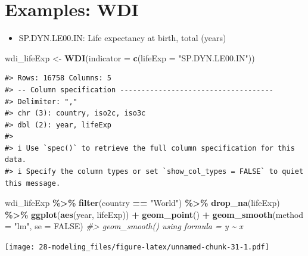 \documentclass[
  xelatex, ja=standard]{bxjsbook}
\newenvironment{Shaded}{\begin{snugshade}}{\end{snugshade}}
\newcommand{\AttributeTok}[1]{\textcolor[rgb]{0.13,0.29,0.53}{#1}}
\newcommand{\CommentTok}[1]{\textcolor[rgb]{0.56,0.35,0.01}{\textit{#1}}}
\newcommand{\ConstantTok}[1]{\textcolor[rgb]{0.56,0.35,0.01}{#1}}
\newcommand{\FunctionTok}[1]{\textcolor[rgb]{0.13,0.29,0.53}{\textbf{#1}}}
\newcommand{\NormalTok}[1]{#1}
\newcommand{\OtherTok}[1]{\textcolor[rgb]{0.56,0.35,0.01}{#1}}
\newcommand{\SpecialCharTok}[1]{\textcolor[rgb]{0.81,0.36,0.00}{\textbf{#1}}}
\newcommand{\StringTok}[1]{\textcolor[rgb]{0.31,0.60,0.02}{#1}}
\providecommand{\tightlist}{%
  \setlength{\itemsep}{0pt}\setlength{\parskip}{0pt}}
\theoremstyle{definition}
\theoremstyle{definition}
\theoremstyle{definition}
\theoremstyle{definition}
\theoremstyle{remark}
\begin{document}
\hypertarget{examples-wdi}{%
\section{Examples: WDI}\label{examples-wdi}}

\begin{itemize}
\tightlist
\item
  SP.DYN.LE00.IN: Life expectancy at birth, total (years)
\end{itemize}

\begin{Shaded}
\begin{Highlighting}[]
\NormalTok{wdi\_lifeExp }\OtherTok{\textless{}{-}} \FunctionTok{WDI}\NormalTok{(}\AttributeTok{indicator =} \FunctionTok{c}\NormalTok{(}\AttributeTok{lifeExp =} \StringTok{"SP.DYN.LE00.IN"}\NormalTok{))}
\end{Highlighting}
\end{Shaded}

\begin{verbatim}
#> Rows: 16758 Columns: 5
#> -- Column specification ------------------------------------
#> Delimiter: ","
#> chr (3): country, iso2c, iso3c
#> dbl (2): year, lifeExp
#> 
#> i Use `spec()` to retrieve the full column specification for this data.
#> i Specify the column types or set `show_col_types = FALSE` to quiet this message.
\end{verbatim}

\begin{Shaded}
\begin{Highlighting}[]
\NormalTok{wdi\_lifeExp }\SpecialCharTok{\%\textgreater{}\%} \FunctionTok{filter}\NormalTok{(country }\SpecialCharTok{==} \StringTok{"World"}\NormalTok{) }\SpecialCharTok{\%\textgreater{}\%} \FunctionTok{drop\_na}\NormalTok{(lifeExp) }\SpecialCharTok{\%\textgreater{}\%}
  \FunctionTok{ggplot}\NormalTok{(}\FunctionTok{aes}\NormalTok{(year, lifeExp)) }\SpecialCharTok{+} \FunctionTok{geom\_point}\NormalTok{() }\SpecialCharTok{+} \FunctionTok{geom\_smooth}\NormalTok{(}\AttributeTok{method =} \StringTok{"lm"}\NormalTok{, }\AttributeTok{se =} \ConstantTok{FALSE}\NormalTok{)}
\CommentTok{\#\textgreater{} \textasciigrave{}geom\_smooth()\textasciigrave{} using formula = \textquotesingle{}y \textasciitilde{} x\textquotesingle{}}
\end{Highlighting}
\end{Shaded}

\texttt{[image: 28-modeling\_files/figure-latex/unnamed-chunk-31-1.pdf]}
\end{document}
